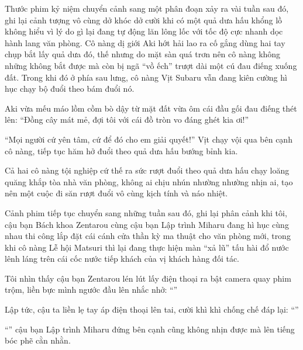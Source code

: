 \documentclass[../main.tex]{subfiles}
\begin{document}
Thước phim kỷ niệm chuyển cảnh sang một phân đoạn xảy ra vài tuần sau đó, ghi lại cảnh tượng vô cùng dở khóc dở cười khi có một quả dưa hấu khổng lồ không hiểu vì lý do gì lại đang tự động lăn lông lốc với tốc độ cực nhanh dọc hành lang văn phòng. Cô nàng dị giới Aki hớt hải lao ra cố gắng dùng hai tay chụp bắt lấy quả dưa đó, thế nhưng do mặt sàn quá trơn nên cô nàng không những không bắt được mà còn bị ngã ``vồ ếch'' trượt dài một cú đau điếng xuống đất. Trong khi đó ở phía sau lưng, cô nàng Vịt Subaru vẫn đang kiên cường hì hục chạy bộ đuổi theo bám đuổi nó.

Aki vừa mếu máo lồm cồm bò dậy từ mặt đất vừa ôm cái đầu gối đau điếng thét lên: ``Đồng cây mát mẻ, đợi tôi với cái đồ tròn vo đáng ghét kia ơi!''

``Mọi người cứ yên tâm, cứ để đó cho em giải quyết!'' Vịt chạy vội qua bên cạnh cô nàng, tiếp tục hăm hở đuổi theo quả dưa hấu bướng bỉnh kia.

Cả hai cô nàng tội nghiệp cứ thế ra sức rượt đuổi theo quả dưa hấu chạy loăng quăng khắp tòa nhà văn phòng, không ai chịu nhún nhường nhường nhịn ai, tạo nên một cuộc đi săn rượt đuổi vô cùng kịch tính và náo nhiệt.



Cảnh phim tiếp tục chuyển sang những tuần sau đó, ghi lại phân cảnh khi tôi, cậu bạn Bách khoa Zentarou cùng cậu bạn Lập trình Miharu đang hì hục cùng nhau thi công lắp đặt cái cánh cửa thần kỳ ma thuật cho văn phòng mới, trong khi cô nàng Lễ hội Matsuri thì lại đang thực hiện màn ``xả lũ'' tấu hài đổ nước lênh láng trên cái cốc nước tiếp khách của vị khách hàng đối tác.

Tôi nhìn thấy cậu bạn Zentarou lén lút lấy điện thoại ra bật camera quay phim trộm, liền bực mình ngước đầu lên nhắc nhở: ``''

Lập tức, cậu ta liền lẹ tay áp điện thoại lên tai, cười khì khì chống chế đáp lại: ``''

``'' cậu bạn Lập trình Miharu đứng bên cạnh cũng không nhịn được mà lên tiếng bóc phẽ cằn nhằn.
\end{document}
